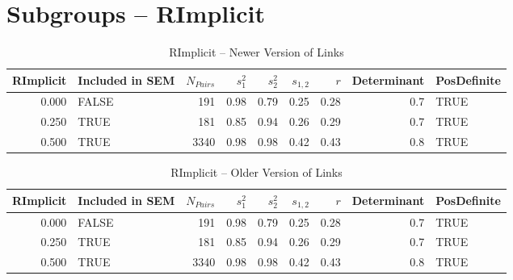 \documentclass{article}\usepackage[]{graphicx}\usepackage[]{color}
\begin{document}
\section{Subgroups --  RImplicit }%
\begin{table}[ht]
\centering
\begin{tabular}{rlrrrrrrl}
  \hline
RImplicit & Included in SEM & $N_{Pairs}$ & $s_1^2$ & $s_2^2$ & $s_{1,2}$ & $r$ & Determinant & PosDefinite \\ 
  \hline
0.000 & FALSE & 191 & 0.98 & 0.79 & 0.25 & 0.28 & 0.7 & TRUE \\ 
  0.250 & TRUE & 181 & 0.85 & 0.94 & 0.26 & 0.29 & 0.7 & TRUE \\ 
  0.500 & TRUE & 3340 & 0.98 & 0.98 & 0.42 & 0.43 & 0.8 & TRUE \\ 
   \hline
\end{tabular}
\caption{RImplicit -- Newer Version of Links} 
\end{table}
\begin{table}[ht]
\centering
\begin{tabular}{rlrrrrrrl}
  \hline
RImplicit & Included in SEM & $N_{Pairs}$ & $s_1^2$ & $s_2^2$ & $s_{1,2}$ & $r$ & Determinant & PosDefinite \\ 
  \hline
0.000 & FALSE & 191 & 0.98 & 0.79 & 0.25 & 0.28 & 0.7 & TRUE \\ 
  0.250 & TRUE & 181 & 0.85 & 0.94 & 0.26 & 0.29 & 0.7 & TRUE \\ 
  0.500 & TRUE & 3340 & 0.98 & 0.98 & 0.42 & 0.43 & 0.8 & TRUE \\ 
   \hline
\end{tabular}
\caption{RImplicit -- Older Version of Links} 
\end{table}
\end{document}
